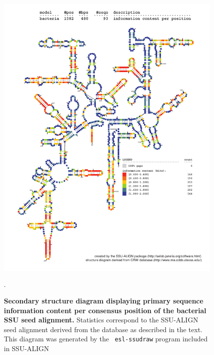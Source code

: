\begin{figure}
\begin{center}
\includegraphics[width=5.7in]{Figures/bacteria-0p1-info}
\end{center}
\caption[Secondary structure diagram displaying primary sequence
  information content per consensus position of the bacterial SSU seed
  alignment]{\textbf{Secondary structure diagram displaying primary
  sequence information content per consensus position of the bacterial SSU seed
  alignment.} Statistics correspond to the SSU-ALIGN seed
  alignment derived from the  database \cite{CannoneGutell02}
  as described in the text. This diagram was generated by the {\tt
  esl-ssudraw} program included in SSU-ALIGN}.
\label{fig:bacinfo}
\end{figure}


